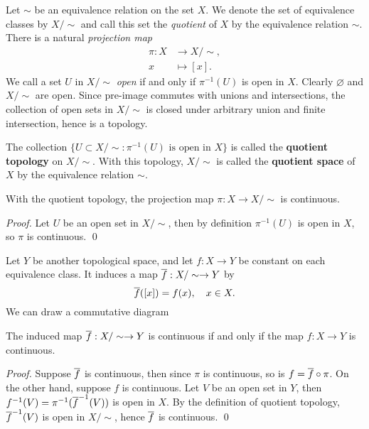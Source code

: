 Let $\sim$ be an equivalence relation on the set $X$. We denote the set of equivalence classes by $X /\sim$ and call this set the \textit{quotient} of $X$ by the equivalence relation $\sim$. There is a natural \textit{projection map} 
\begin{align*}
    \pi:X &\to X / \sim,  \\
    x &\mapsto [x].
\end{align*}
We call a set $U$ in $X / \sim$ \textit{open} if and only if $\pi^{-1}(U)$ is open in $X$. Clearly $\varnothing$ and $X / \sim$ are open. Since pre-image commutes with unions and intersections, the collection of open sets in $X / \sim$ is closed under arbitrary union and finite intersection, hence is a topology. 
\begin{definition}
    The collection $\{U \subset X / \sim: \pi^{-1}(U) \text{ is open in }X\}$ is called the \textbf{quotient topology} on $X / \sim$. With this topology, $X / \sim$ is called the \textbf{quotient space} of $X$ by the equivalence relation $\sim$. 
\end{definition}
\begin{exercise}
    With the quotient topology, the projection map $\pi:X \to X / \sim$ is continuous.
\end{exercise}
\begin{proof}
    Let $U$ be an open set in $X / \sim$, then by definition $\pi^{-1}(U)$ is open in $X$, so $\pi$ is continuous. \qed 
\end{proof}
Let $Y$ be another topological space, and let $f:X \to Y$ be constant on each equivalence class. It induces a map $\overline{f}:X / \sim \to Y$ by 
$$\overline{f}([x]) = f(x), \quad x \in X. $$
We can draw a commutative diagram
\begin{center}
\end{center}
\begin{proposition}
    The induced map $\overline{f}:X / \sim \to Y$ is continuous if and only if the map $f:X \to Y$ is continuous. 
\end{proposition}
\begin{proof}
    Suppose $\overline{f}$ is continuous, then since $\pi$ is continuous, so is $f = \overline{f} \circ \pi$. On the other hand, suppose $f$ is continuous. Let $V$
    be an open set in $Y$, then $f^{-1}(V) = \pi^{-1}(\overline{f}^{-1}(V))$ is open in $X$. By the definition of quotient topology, $\overline{f}^{-1}(V)$ is open in $X/\sim$, hence $\overline{f}$ is continuous. \qed 
\end{proof}
